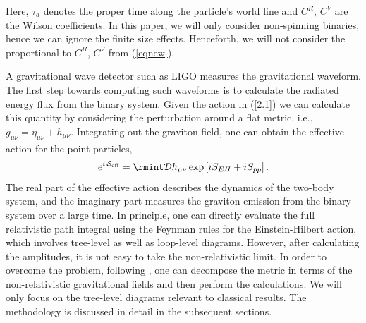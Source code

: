 Here, $\tau_a$ denotes the proper time along the particle's world line and  $C^R$, $C^V$ are the Wilson coefficients. In this paper, we will only consider non-spinning binaries, hence we can ignore the finite size effects. Henceforth, we will not consider the proportional to $C^R$, $C^V$ from (\ref{eqnew}).  \par
A gravitational wave detector such as LIGO measures the gravitational waveform. The first step towards computing such waveforms is to calculate the radiated energy flux from the binary system. Given the action in (\ref{2.1}) we can calculate this quantity by considering the perturbation around a flat metric, i.e., $g_{\mu\nu}=\eta_{\mu\nu}+h_{\mu\nu}$. Integrating out the graviton field, one can obtain the effective action for the point particles,
\begin{eqnarray}
    e^{i\,\mathcal{S}_{\text{eff}}}=\rmint \mathcal{D}h_{\mu\nu} \exp{[iS_{EH}+iS_{pp}]}\,.
\end{eqnarray}\label{2.4}
The real part of the effective action describes the dynamics of the two-body system, and the imaginary part measures the graviton emission from the binary system over a large time. In principle, one can directly evaluate the full relativistic path integral using the Feynman rules for the Einstein-Hilbert action, which involves tree-level as well as loop-level diagrams. However, after calculating the amplitudes, it is not easy to take the non-relativistic limit. In order to overcome the problem, following \cite{Kol:2007bc}, one can decompose the metric in terms of the non-relativistic gravitational fields and then perform the calculations. We will only focus on the tree-level diagrams relevant to classical results. The methodology is discussed in detail in the subsequent sections. \par

